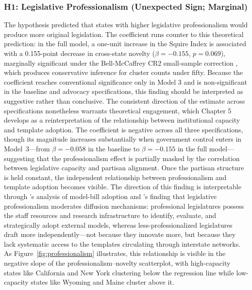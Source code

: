\subsubsection{H1: Legislative Professionalism (Unexpected Sign; Marginal)}
The hypothesis predicted that states with higher legislative professionalism would produce more original legislation. The coefficient runs counter to this theoretical prediction: in the full model, a one-unit increase in the Squire Index is associated with a 0.155-point decrease in cross-state novelty ($\beta = -0.155$, $p = 0.069$), marginally significant under the Bell-McCaffrey CR2 small-sample correction \parencite{pustejovskyCRVEAnywhere2018}, which produces conservative inference for cluster counts under fifty. Because the coefficient reaches conventional significance only in Model 3 and is non-significant in the baseline and advocacy specifications, this finding should be interpreted as suggestive rather than conclusive. The consistent direction of the estimate across specifications nonetheless warrants theoretical engagement, which Chapter 5 develops as a reinterpretation of the relationship between institutional capacity and template adoption. The coefficient is negative across all three specifications, though its magnitude increases substantially when government control enters in Model~3---from $\beta = -0.058$ in the baseline to $\beta = -0.155$ in the full model---suggesting that the professionalism effect is partially masked by the correlation between legislative capacity and partisan alignment. Once the partisan structure is held constant, the independent relationship between professionalism and template adoption becomes visible. The direction of this finding is interpretable through \textcite{jansaCopyPasteLawmaking2019}'s analysis of model-bill adoption and \textcite{shipanMechanismsPolicyDiffusion2008a}'s finding that legislative professionalism moderates diffusion mechanisms: professional legislatures possess the staff resources and research infrastructure to identify, evaluate, and strategically adopt external models, whereas less-professionalized legislatures draft more independently---not because they innovate more, but because they lack systematic access to the templates circulating through interstate networks. As Figure~\ref{fig:professionalism} illustrates, this relationship is visible in the negative slope of the professionalism--novelty scatterplot, with high-capacity states like California and New York clustering below the regression line while low-capacity states like Wyoming and Maine cluster above it.

